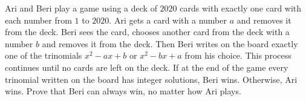 Ari and Beri play a game using a deck of $2020$ cards with exactly one card with each number from $1$ to $2020$. Ari gets a card with a number $a$ and removes it from the deck. Beri sees the card, chooses another card from the deck with a number $b$ and removes it from the deck. Then Beri writes on the board exactly one of the trinomials $x^2-ax+b$ or $x^2-bx+a$ from his choice. This process continues until no cards are left on the deck. If at the end of the game every trinomial written on the board has integer solutions, Beri wins. Otherwise, Ari wins. Prove that Beri can always win, no matter how Ari plays.